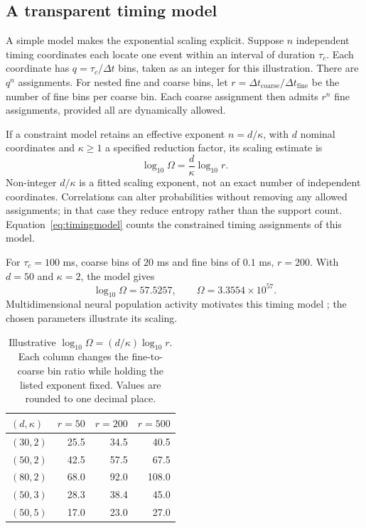\documentclass[10pt,a4paper,twocolumn]{article}
\numberwithin{equation}{section}
\begin{document}
\subsection{A transparent timing model}

A simple model makes the exponential scaling explicit. Suppose $n$ independent timing coordinates each locate one event within an interval of duration $\tau_c$. Each coordinate has $q=\tau_c/\Delta t$ bins, taken as an integer for this illustration. There are $q^n$ assignments. For nested fine and coarse bins, let $r=\Delta t_{\mathrm{coarse}}/\Delta t_{\mathrm{fine}}$ be the number of fine bins per coarse bin. Each coarse assignment then admits $r^n$ fine assignments, provided all are dynamically allowed.

If a constraint model retains an effective exponent $n=d/\kappa$, with $d$ nominal coordinates and $\kappa\geq1$ a specified reduction factor, its scaling estimate is
\begin{equation}
\log_{10}\Omega=\frac{d}{\kappa}\log_{10}r.
\label{eq:timingmodel}
\end{equation}
Non-integer $d/\kappa$ is a fitted scaling exponent, not an exact number of independent coordinates. Correlations can alter probabilities without removing any allowed assignments; in that case they reduce entropy rather than the support count. Equation~\eqref{eq:timingmodel} counts the constrained timing assignments of this model.

For $\tau_c=100$ ms, coarse bins of $20$ ms and fine bins of $0.1$ ms, $r=200$. With $d=50$ and $\kappa=2$, the model gives
\begin{equation}
\log_{10}\Omega=57.5257,\qquad
\Omega=3.3554\times10^{57}.
\end{equation}
Multidimensional neural population activity motivates this timing model \cite{stringer2019}; the chosen parameters illustrate its scaling.

\begin{table}[t]
\centering
\caption{Illustrative $\log_{10}\Omega=(d/\kappa)\log_{10}r$. Each column changes the fine-to-coarse bin ratio while holding the listed exponent fixed. Values are rounded to one decimal place.}
\label{tab:sensitivity}
\begin{tabular}{@{}lrrr@{}}
\toprule
$(d,\kappa)$ & $r=50$ & $r=200$ & $r=500$\\
\midrule
$(30,2)$ & 25.5 & 34.5 & 40.5\\
$(50,2)$ & 42.5 & 57.5 & 67.5\\
$(80,2)$ & 68.0 & 92.0 & 108.0\\
$(50,3)$ & 28.3 & 38.4 & 45.0\\
$(50,5)$ & 17.0 & 23.0 & 27.0\\
\bottomrule
\end{tabular}
\end{table}
\end{document}
